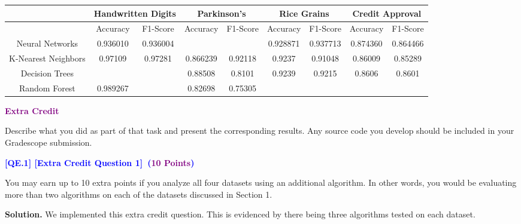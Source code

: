 \documentclass{article}
\newcommand{\HIGHLIGHT}[1]{\textcolor{blue}{\textbf{#1}}}
\newcommand{\POINTS}[1]{\textcolor{purple}{\textbf{{#1}}}}
\begin{document}
\newpage
\begin{table}[]
\begin{tabular}{|c|cc|cc|cc|cc|}
\hline
                    & \multicolumn{2}{c|}{Handwritten Digits}  & \multicolumn{2}{c|}{Parkinson's}         & \multicolumn{2}{c|}{Rice Grains}         & \multicolumn{2}{c|}{Credit Approval}     \\ \hline
                    & \multicolumn{1}{c|}{Accuracy} & F1-Score & \multicolumn{1}{c|}{Accuracy} & F1-Score & \multicolumn{1}{c|}{Accuracy} & F1-Score & \multicolumn{1}{c|}{Accuracy} & F1-Score \\ \hline
Neural Networks     & \multicolumn{1}{c|}{0.936010}         &     0.936004     & \multicolumn{1}{c|}{}         &          & \multicolumn{1}{c|}{\cellcolor{blue!25}0.928871}         &    \cellcolor{blue!25} 0.937713     & \multicolumn{1}{c|}{\cellcolor{blue!25}0.874360}         &    \cellcolor{blue!25} 0.864466      \\ \hline
K-Nearest Neighbors & \multicolumn{1}{c|}{0.97109}    & 0.97281     & \multicolumn{1}{c|}{\cellcolor{blue!25}0.866239}     &   \cellcolor{blue!25} 0.92118       & \multicolumn{1}{c|}{0.9237}         &  0.91048        & \multicolumn{1}{c|}{0.86009}  & 0.85289    \\ \hline
Decision Trees      & \multicolumn{1}{c|}{}           &             & \multicolumn{1}{c|}{0.88508} &  0.8101  & \multicolumn{1}{c|}{0.9239}   & 0.9215   & \multicolumn{1}{c|}{0.8606}   & 0.8601   \\ \hline
Random Forest       & \multicolumn{1}{c|}{\cellcolor{blue!25}0.989267}   & \cellcolor{blue!25}{0.98767}   & \multicolumn{1}{c|}{0.82698} & 0.75305   & \multicolumn{1}{c|}{}   &   & \multicolumn{1}{c|}{}   &   \\ \hline
\end{tabular}
\end{table}

\newpage
\noindent \textcolor{purple}{\textbf{\Large{Extra Credit}}}
\vspace{0.6cm}

\noindent Describe what you did as part of that task and present the corresponding results. Any source code you develop should be included in your Gradescope submission.

    \vspace{1.25cm}
    \noindent \textbf{\HIGHLIGHT{[QE.1] [Extra Credit Question \raisebox{0.2ex}{\scalebox{0.8}{\textnormal{\#}}}1]~(\POINTS{10 Points})}} 
    \vspace{0.3cm}
    
    \noindent You may earn up to 10 extra points if you analyze all four datasets using an additional algorithm. In other
words, you would be evaluating more than two algorithms on each of the datasets discussed in Section 1.

\noindent \textbf{Solution.} We implemented this extra credit question. This is evidenced by there being three algorithms tested on each dataset.
\end{document}
